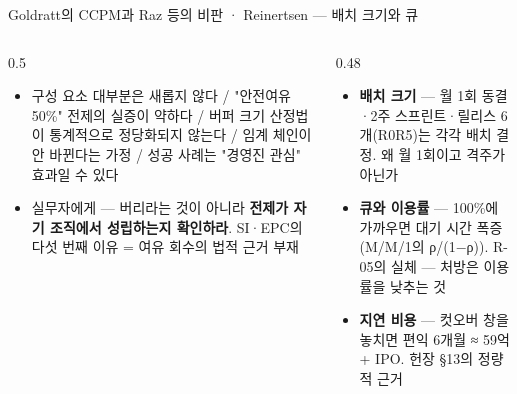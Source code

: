 \begin{frame}{Goldratt의 CCPM과 Raz 등의 비판 · Reinertsen — 배치 크기와 큐}
\begin{columns}[T]
\begin{column}{0.5\textwidth}
\begin{itemize}
\item 구성 요소 대부분은 새롭지 않다 / "안전여유 50\%" 전제의 실증이 약하다 / 버퍼 크기 산정법이 통계적으로 정당화되지 않는다 / 임계 체인이 안 바뀐다는 가정 / 성공 사례는 "경영진 관심" 효과일 수 있다
\item 실무자에게 — 버리라는 것이 아니라 \textbf{전제가 자기 조직에서 성립하는지 확인하라}. SI·EPC의 다섯 번째 이유 = 여유 회수의 법적 근거 부재
\end{itemize}
\end{column}
\begin{column}{0.48\textwidth}
\begin{itemize}
\item \textbf{배치 크기} — 월 1회 동결·2주 스프린트·릴리스 6개(R0\til{}R5)는 각각 배치 결정. 왜 월 1회이고 격주가 아닌가
\item \textbf{큐와 이용률} — 100\%에 가까우면 대기 시간 폭증(M/M/1의 ρ/(1$-$ρ)). R-05의 실체 — 처방은 이용률을 낮추는 것
\item \textbf{지연 비용} — 컷오버 창을 놓치면 편익 6개월 ≈ 59억 + IPO. 헌장 §13의 정량적 근거
\end{itemize}
\end{column}
\end{columns}
\end{frame}

